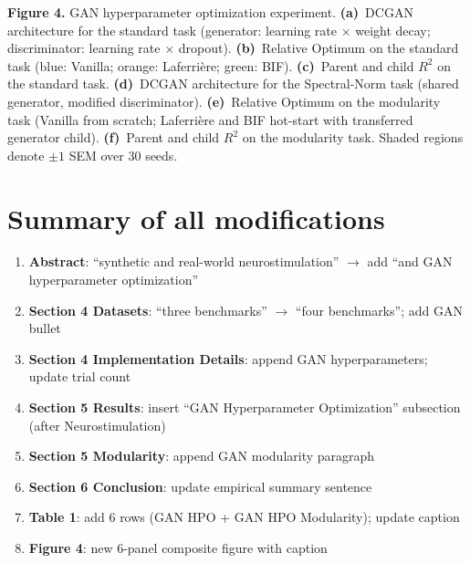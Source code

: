 \documentclass[11pt]{article}
\begin{document}
\noindent\textbf{Figure 4.} GAN hyperparameter optimization experiment.
\textbf{(a)}~DCGAN architecture for the standard task
(generator: learning rate $\times$ weight decay;
discriminator: learning rate $\times$ dropout).
\textbf{(b)}~Relative Optimum on the standard task
(blue: Vanilla; orange: Laferri\`ere; green: BIF).
\textbf{(c)}~Parent and child $R^2$ on the standard task.
\textbf{(d)}~DCGAN architecture for the Spectral-Norm task
(shared generator, modified discriminator).
\textbf{(e)}~Relative Optimum on the modularity task
(Vanilla from scratch; Laferri\`ere and BIF hot-start with
transferred generator child).
\textbf{(f)}~Parent and child $R^2$ on the modularity task.
Shaded regions denote $\pm 1$ SEM over 30 seeds.

\section*{Summary of all modifications}

\begin{enumerate}
\item \textbf{Abstract}: ``synthetic and real-world neurostimulation'' $\to$ add ``and GAN hyperparameter optimization''
\item \textbf{Section 4 Datasets}: ``three benchmarks'' $\to$ ``four benchmarks''; add GAN bullet
\item \textbf{Section 4 Implementation Details}: append GAN hyperparameters; update trial count
\item \textbf{Section 5 Results}: insert ``GAN Hyperparameter Optimization'' subsection (after Neurostimulation)
\item \textbf{Section 5 Modularity}: append GAN modularity paragraph
\item \textbf{Section 6 Conclusion}: update empirical summary sentence
\item \textbf{Table 1}: add 6 rows (GAN HPO + GAN HPO Modularity); update caption
\item \textbf{Figure 4}: new 6-panel composite figure with caption
\end{enumerate}
\end{document}
